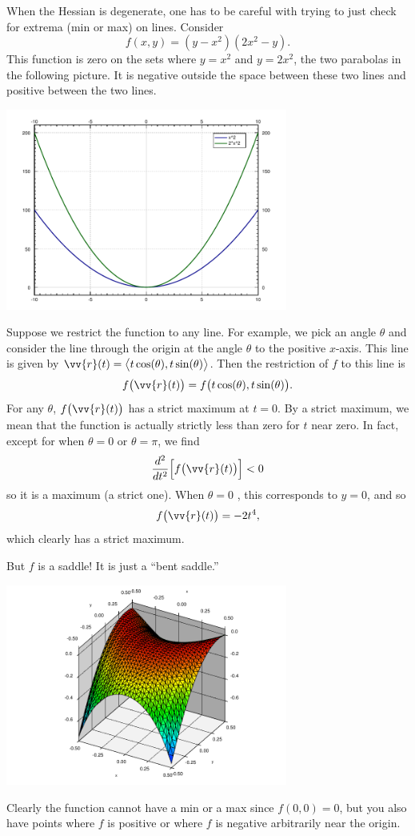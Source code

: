 \documentclass[12pt]{article}
\begin{document}
When the Hessian is degenerate,
one has to be careful with trying to just check for extrema (min or max) on
lines.  Consider
\[
f(x,y) = (y-x^2)(2x^2-y) .
\]
This function is zero on the sets where $y=x^2$ and $y=2x^2$, the two
parabolas in the following picture.  It is negative outside the space
between these two lines and positive between the two lines.
\begin{center}
\includegraphics[width=3.65in]{peanocurves}
\end{center}
Suppose we restrict the function to any line. For example, we pick an angle
$\theta$ and consider the line through the origin at the angle
$\theta$ to the positive $x$-axis.
This line is given by $\vv{r}(t) = \bigl\langle t \cos(\theta),t
\sin(\theta)\bigr\rangle$.  Then the restriction of $f$ to this line is
\[
f\bigl(\vv{r}(t)\bigr) = f\bigl(t\cos(\theta),t\sin (\theta)\bigr) .
\]
For any $\theta$, $f\bigl(\vv{r}(t)\bigr)$ has a strict maximum at $t=0$.
By a strict maximum, we mean that the function is actually
strictly less than zero for $t$ near zero.
In fact, except for when $\theta=0$ or $\theta=\pi$, we find
\[
\frac{d^2}{dt^2} \Bigl[ f \bigl( \vv{r}(t) \bigr) \Bigr] < 0
\]
so it is a maximum (a strict one).  When $\theta = 0$ , this corresponds to
$y=0$, and so
\[
f \bigl( \vv{r}(t) \bigr) = -2t^4 ,
\]
which clearly has a strict maximum.

But $f$ is a saddle!  It is just a ``bent saddle.''
\begin{center}
\includegraphics[width=3.65in]{peanosurface}
\end{center}
Clearly the function cannot have a min or a max since $f(0,0)=0$, but you
also have points where $f$ is positive or where $f$ is negative arbitrarily
near the origin.
\end{document}
